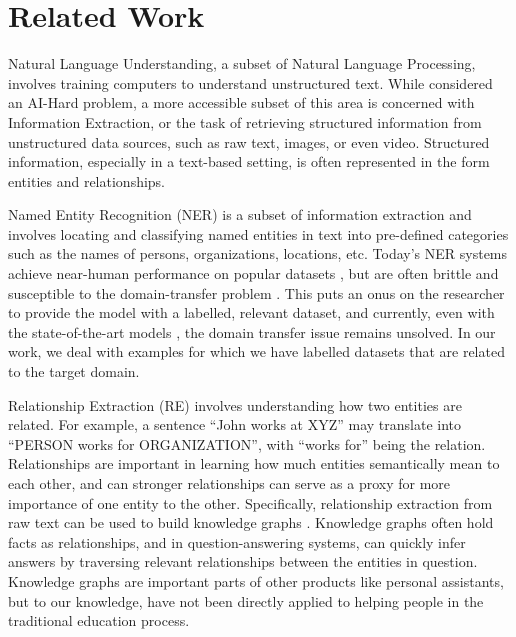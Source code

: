 \documentclass[11pt,a4paper]{article}
\begin{document}
\section{Related Work}

Natural Language Understanding, a subset of Natural Language Processing, involves training computers to understand unstructured text. While considered an AI-Hard problem, a more accessible subset of this area is concerned with Information Extraction, or the task of retrieving structured information from unstructured data sources, such as raw text, images, or even video. Structured information, especially in a text-based setting, is often represented in the form entities and relationships. 

Named Entity Recognition (NER) is a subset of information extraction and involves locating and classifying named entities in text into pre-defined categories such as the names of persons, organizations, locations, etc. Today’s NER systems achieve near-human performance on popular datasets \cite{M98-1002}, but are often brittle and susceptible to the domain-transfer problem \cite{Poibeau01propername}. This puts an onus on the researcher to provide the model with a labelled, relevant dataset, and currently, even with the state-of-the-art models \cite{Turian:2010:WRS:1858681.1858721} \cite{Lin:2009:PCD:1690219.1690290}, the domain transfer issue remains unsolved. In our work, we deal with examples for which we have labelled datasets that are related to the target domain.

Relationship Extraction (RE) involves understanding how two entities are related. For example, a sentence “John works at XYZ” may translate into “PERSON works for ORGANIZATION”, with “works for” being the relation. Relationships are important in learning how much entities semantically mean to each other, and can stronger relationships can serve as a proxy for more importance of one entity to the other. Specifically, relationship extraction from raw text can be used to build knowledge graphs \cite{Ramakrishnan:2006:FSR:2127045.2127088}. Knowledge graphs often hold facts as relationships, and in question-answering systems, can quickly infer answers by traversing relevant relationships between the entities in question. Knowledge graphs are important parts of other products like personal assistants, but to our knowledge, have not been directly applied to helping people in the traditional education process.
\end{document}
